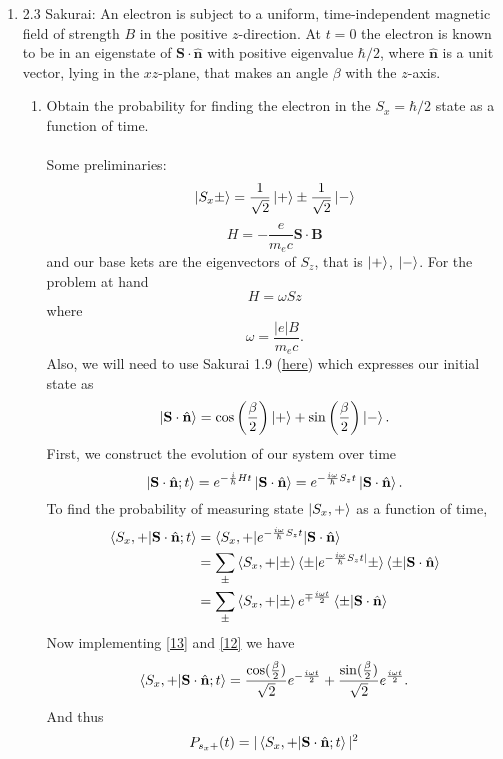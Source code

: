 \documentclass[11pt,letterpaper]{article}
\newcommand{\vect}[1]{\mathbf{#1}}
\begin{document}
\begin{enumerate}
\begin{enumerate}
\end{enumerate}
\item 2.3 Sakurai: An electron is subject to a uniform, time-independent magnetic field of strength $B$ in the positive $z$-direction. At $t=0$ the electron is known to be in an eigenstate of $\vect S\cdot\hat{\vect n}$ with positive eigenvalue $\hbar/2$, where $\hat{\vect n}$ is a unit vector, lying in the $xz$-plane, that makes an angle $\beta$ with the $z$-axis.
\begin{enumerate}
\item Obtain the probability for finding the electron in the $S_x =\hbar/2$ state as a function of time.
\\ \\Some preliminaries:
\begin{equation}\label{13}\ket{S_x\pm} = \frac{1}{\sqrt 2}\ket + \pm \frac{1}{\sqrt 2}\ket -\end{equation}
$$H = -\frac{e}{m_ec}\vect S\cdot\vect B$$
and our base kets are the eigenvectors of $S_z$, that is $\ket +$, $\ket -$. 
For the problem at hand
$$H = \omega Sz$$ where
$$\omega = \frac{|e|B}{m_ec} .$$
Also, we will need to use Sakurai 1.9 (\href{https://www3.nd.edu/~bjanko/p70007/qm1hw2answers.pdf}{here}) which expresses our initial state as
\begin{equation}\label{12}\ket{\vect S\cdot\hat{\vect n}} = \cos\left(\frac{\beta}{2}\right)\ket + + \sin\left(\frac{\beta}{2}\right)\ket -.\end{equation}
First, we construct the evolution of our system over time
$$\ket{\vect S\cdot\hat{\vect n};t}=e^{-\frac{i}{\hbar}Ht}\ket{\vect S\cdot\hat{\vect n}}=e^{-\frac{i\omega}{\hbar}S_zt}\ket{\vect S\cdot\hat{\vect n}}.$$
To find the probability of measuring state $\ket{S_x, +}$ as a function of time,
\begin{align*}\braket{S_x,+|\vect S\cdot\hat{\vect n};t} &= \braket{S_x,+|e^{-\frac{i\omega}{\hbar}S_zt}|\vect S\cdot\hat{\vect n}}\\
&=\sum_\pm{\braket{S_x,+|\pm}\braket{\pm|e^{-\frac{i\omega}{\hbar}S_zt|}\pm}\braket{\pm|\vect S\cdot\hat{\vect n}}}\\
&=\sum_\pm{\braket{S_x,+|\pm}e^{\mp\frac{i\omega t}{2}}\braket{\pm|\vect S\cdot\hat{\vect n}}}
\end{align*}
Now implementing \eqref{13} and \eqref{12} we have
$$\braket{S_x,+|\vect S\cdot\hat{\vect n};t} = \frac{\cos(\frac{\beta}{2})}{\sqrt 2}e^{-\frac{i\omega t}{2}}+\frac{\sin(\frac{\beta}{2})}{\sqrt 2}e^{\frac{i\omega t}{2}}.$$
And thus
\begin{align*}P_{s_x+}(t) &= |\braket{S_x,+|\vect S\cdot\hat{\vect n};t}|^2\\

\end{align*}
\end{enumerate}
\end{enumerate}
\end{document}
